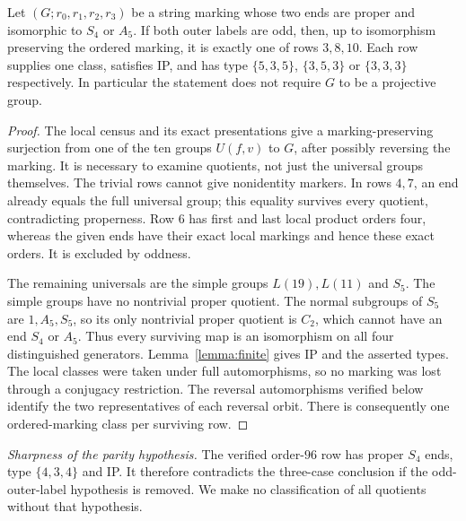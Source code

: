 \begin{theorem}\label{thm:finite}
Let $(G;r_0,r_1,r_2,r_3)$ be a string marking whose two ends are proper
and isomorphic to $S_4$ or $A_5$. If both outer labels are odd, then,
up to isomorphism preserving the ordered marking, it is exactly one of
rows $3,8,10$. Each row supplies one class, satisfies IP, and has type
$\{5,3,5\}$, $\{3,5,3\}$ or $\{3,3,3\}$ respectively.
In particular the statement does not require $G$ to be a projective group.
\end{theorem}
\begin{proof}
The local census and its exact presentations give a marking-preserving
surjection from one of the ten groups $U(f,v)$ to $G$, after possibly
reversing the marking. It is necessary to examine quotients, not just
the universal groups themselves. The trivial rows cannot give nonidentity
markers. In rows $4,7$, an end already equals the full universal group;
this equality survives every quotient, contradicting properness. Row $6$
has first and last local product orders four, whereas the given ends
have their exact local markings and hence these exact orders. It is
excluded by oddness.

The remaining universals are the simple groups $L(19),L(11)$ and $S_5$.
The simple groups have no nontrivial proper quotient. The normal subgroups
of $S_5$ are $1,A_5,S_5$, so its only nontrivial proper quotient is $C_2$,
which cannot have an end $S_4$ or $A_5$. Thus every surviving map is an
isomorphism on all four distinguished generators. Lemma~\ref{lemma:finite}
gives IP and the asserted types. The local classes were taken under full
automorphisms, so no marking was lost through a conjugacy restriction.
The reversal automorphisms verified below identify the two representatives
of each reversal orbit. There is consequently one ordered-marking class
per surviving row.
\end{proof}

\noindent\emph{Sharpness of the parity hypothesis.} The verified order-$96$
row has proper $S_4$ ends, type $\{4,3,4\}$ and IP. It therefore
contradicts the three-case conclusion if the odd-outer-label hypothesis
is removed. We make no classification of all quotients without that
hypothesis.


